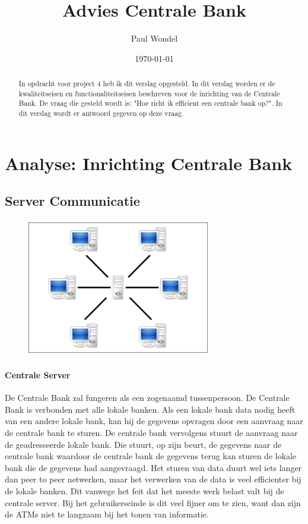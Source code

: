 \documentclass{article}
\begin{document}
\title{Advies Centrale Bank}
\author{Paul Wondel}
\date{\today}
\maketitle

\begin{abstract}
In opdracht voor project 4 heb ik dit verslag opgesteld.
In dit verslag worden er de kwaliteitseisen en functionaliteitseisen
beschreven voor de inrichting van de Centrale Bank.
De vraag die gesteld wordt is: "Hoe richt ik efficient een centrale bank op?".
In dit verslag wordt er antwoord gegeven op deze vraag.
\end{abstract}

\clearpage
\newpage

\tableofcontents

\clearpage
\newpage

\section{Analyse: Inrichting Centrale Bank}
\vspace{6mm}
\subsection{Server Communicatie}
\begin{figure}[h]
\includegraphics[height=6cm, width=8cm]{centralserver.png}
\centering
\end{figure}

\paragraph{Centrale Server}
De Centrale Bank zal fungeren als een zogenaamd tussenpersoon.
De Centrale Bank is verbonden met alle lokale banken.
Als een lokale bank data nodig heeft van een andere lokale bank,
kan hij de gegevens opvragen door een aanvraag naar de centrale bank te sturen.
De centrale bank vervolgens stuurt de aanvraag naar de geadresseerde lokale bank.
Die stuurt, op zijn beurt, de gegevens naar de centrale bank waardoor de centrale bank
de gegevens terug kan sturen de lokale bank die de gegevens had aangevraagd.
Het sturen van data duurt wel iets langer dan peer to peer netwerken,
maar het verwerken van de data is veel efficienter bij de lokale banken.
Dit vanwege het feit dat het meeste werk belast valt bij de centrale server.
Bij het gebruikerseinde is dit veel fijner om te zien,
want dan zijn de ATMs niet te langzaam bij het tonen van informatie.
\end{document}
